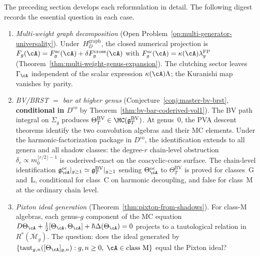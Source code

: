 \begin{remark}
\label{rem:five-problems-theta-oc}
The preceding section develops each reformulation in detail.
The following digest records the essential question in each case.

\begin{enumerate}[label=\textup{(\roman*)}]
\item \emph{Multi-weight graph decomposition}
 \textup{(}Open Problem~\ref{op:multi-generator-universality}\textup{)}.
 Under~$H_D^{\mathrm{graph}}$, the closed numerical projection is
	$F_g(\cA)=F_g^{\mathrm{sc}}(\cA)
	+\delta F_g^{\mathrm{cross}}(\cA)$ with
	$F_g^{\mathrm{sc}}(\cA)=\kappa(\cA)\lambda_g^{\mathrm{FP}}$
	 (Theorem~\ref{thm:multi-weight-genus-expansion}).
 The clutching sector leaves
 $\Gamma_\cA$ independent of the scalar expression $\kappa(\cA)\Lambda$;
 the Kuranishi map
 vanishes by parity.

\item \emph{BV/BRST $=$ bar at higher genus}
 \textup{(}Conjecture~\ref{conj:master-bv-brst},
 \textbf{conditional in $D^{\mathrm{co}}$} by
 Theorem~\ref{thm:bv-bar-coderived-vol1}\textup{)}.
 The BV path integral on $\Sigma_g$ produces
 $\Theta^{\mathrm{BV}}_T
 \in \MC(\mathfrak{g}^{\mathrm{BV}}_T)$.
 At genus~$0$, the PVA descent theorems identify the two
 convolution algebras and their MC elements.
 Under the harmonic-factorization package in $D^{\mathrm{co}}$, the
 identification extends to all genera and all shadow classes: the
 degree-$r$ chain-level obstruction
 $\delta_r \propto m_0^{\lfloor r/2\rfloor - 1}$ is
 coderived-exact on the coacyclic-cone surface. The chain-level
 identification
 $\mathfrak{g}^{\mathrm{oc}}_\cA|_{g \geq 1}
 \simeq \mathfrak{g}^{\mathrm{BV}}_T|_{g \geq 1}$
 sending $\Theta^{\mathrm{oc}}_\cA$ to
 $\Theta^{\mathrm{BV}}_T$ is proved for classes~G and~L,
 conditional for class~C on harmonic decoupling, and false for
 class~M at the ordinary chain level.

\item \emph{Pixton ideal generation}
 \textup{(}Theorem~\ref{thm:pixton-from-shadows}\textup{)}.
 For class-M algebras, each genus-$g$ component of the MC equation
 $D\Theta_\cA + \tfrac{1}{2}[\Theta_\cA,\Theta_\cA]
 + \hbar\Delta(\Theta_\cA) = 0$
 projects to a tautological relation in
 $R^*(\overline{\mathcal{M}}_g)$.
 The question: does the ideal generated by
 $\{\operatorname{taut}_{g,n}([\Theta_\cA]_{g,n}) :
 g,n \geq 0,\; \cA \in \text{class M}\}$
 equal the Pixton ideal?


\end{enumerate}
\end{remark}
